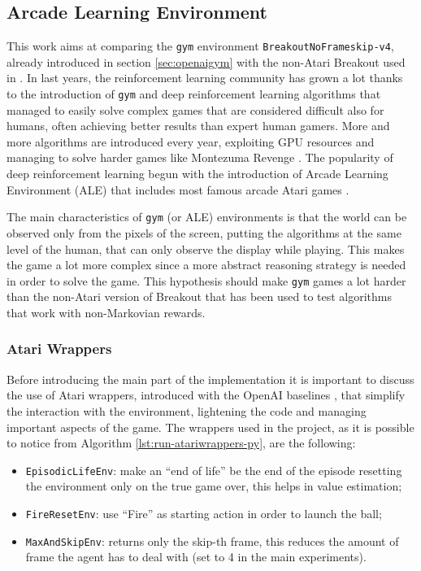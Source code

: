 \subsection{Arcade Learning Environment}
This work aims at comparing the \texttt{gym} environment
\texttt{BreakoutNoFrameskip-v4}, already introduced in section
\ref{sec:openaigym} with the non-Atari Breakout used in
\cite{DBLP:journals/corr/abs-1807-06333}. In last years, the reinforcement
learning community has grown a lot thanks to the introduction of \texttt{gym}
and deep reinforcement learning algorithms \cite{mnih2015humanlevel} that
managed to easily solve complex games that are considered difficult also
for humans, often achieving better results than expert human gamers. More
and more algorithms are introduced every year, exploiting GPU resources
and managing to solve harder games like Montezuma Revenge \cite{uber-goexplore}.
The popularity of deep reinforcement learning begun with the introduction of
Arcade Learning Environment (ALE) that includes most
famous arcade Atari games \cite{bellemare13arcade}.

The main characteristics of \texttt{gym} (or ALE) environments is that the
world can be observed only from the pixels of the screen, putting the
algorithms at the same level of the human, that can only observe the display
while playing. This makes the game a lot more complex since a more abstract
reasoning strategy is needed in order to solve the game. This hypothesis should
make \texttt{gym} games a lot harder than the non-Atari version of Breakout
that has been used to test algorithms that work with non-Markovian rewards.

\subsubsection{Atari Wrappers}
Before introducing the main part of the implementation it is important to
discuss the use of Atari wrappers, introduced with the OpenAI baselines
\cite{openai-baselines}, that simplify the interaction with the environment,
lightening the code and managing important aspects of the game.
The wrappers used in the project, as it is possible to notice from Algorithm
\ref{lst:run-atariwrappers-py}, are the following:
\begin{itemize}
    \item \texttt{EpisodicLifeEnv}: make an ``end of life'' be the end
        of the episode resetting the environment only on the true
        game over, this helps in value estimation;
    \item \texttt{FireResetEnv}: use ``Fire'' as starting action in order
        to launch the ball;
    \item \texttt{MaxAndSkipEnv}: returns only the skip-th frame, this
        reduces the amount of frame the agent has to deal with (set to 4
        in the main experiments).
\end{itemize}

